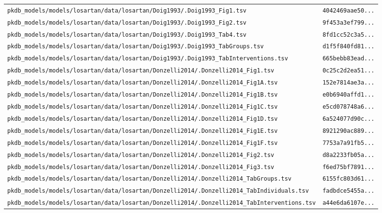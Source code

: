 \begin{longtable}{ll}
\texttt{pkdb\_models/models/losartan/data/losartan/Doig1993/.Doig1993\_Fig1.tsv} & \texttt{4042469aae50...} \\
\texttt{pkdb\_models/models/losartan/data/losartan/Doig1993/.Doig1993\_Fig2.tsv} & \texttt{9f453a3ef799...} \\
\texttt{pkdb\_models/models/losartan/data/losartan/Doig1993/.Doig1993\_Tab4.tsv} & \texttt{8fd1cc52c3a5...} \\
\texttt{pkdb\_models/models/losartan/data/losartan/Doig1993/.Doig1993\_TabGroups.tsv} & \texttt{d1f5f840fd81...} \\
\texttt{pkdb\_models/models/losartan/data/losartan/Doig1993/.Doig1993\_TabInterventions.tsv} & \texttt{665bebb83ead...} \\
\texttt{pkdb\_models/models/losartan/data/losartan/Donzelli2014/.Donzelli2014\_Fig1.tsv} & \texttt{0c25c2d2ea51...} \\
\texttt{pkdb\_models/models/losartan/data/losartan/Donzelli2014/.Donzelli2014\_Fig1A.tsv} & \texttt{152e7814ae3a...} \\
\texttt{pkdb\_models/models/losartan/data/losartan/Donzelli2014/.Donzelli2014\_Fig1B.tsv} & \texttt{e0b6940affd1...} \\
\texttt{pkdb\_models/models/losartan/data/losartan/Donzelli2014/.Donzelli2014\_Fig1C.tsv} & \texttt{e5cd078748a6...} \\
\texttt{pkdb\_models/models/losartan/data/losartan/Donzelli2014/.Donzelli2014\_Fig1D.tsv} & \texttt{6a524077d90c...} \\
\texttt{pkdb\_models/models/losartan/data/losartan/Donzelli2014/.Donzelli2014\_Fig1E.tsv} & \texttt{8921290ac889...} \\
\texttt{pkdb\_models/models/losartan/data/losartan/Donzelli2014/.Donzelli2014\_Fig1F.tsv} & \texttt{7753a7a91fb5...} \\
\texttt{pkdb\_models/models/losartan/data/losartan/Donzelli2014/.Donzelli2014\_Fig2.tsv} & \texttt{d8a2233fb05a...} \\
\texttt{pkdb\_models/models/losartan/data/losartan/Donzelli2014/.Donzelli2014\_Fig3.tsv} & \texttt{f6ed75bf7891...} \\
\texttt{pkdb\_models/models/losartan/data/losartan/Donzelli2014/.Donzelli2014\_TabGroups.tsv} & \texttt{6155fc803d61...} \\
\texttt{pkdb\_models/models/losartan/data/losartan/Donzelli2014/.Donzelli2014\_TabIndividuals.tsv} & \texttt{fadbdce5455a...} \\
\texttt{pkdb\_models/models/losartan/data/losartan/Donzelli2014/.Donzelli2014\_TabInterventions.tsv} & \texttt{a44e6da6107e...} \\

\end{longtable}

